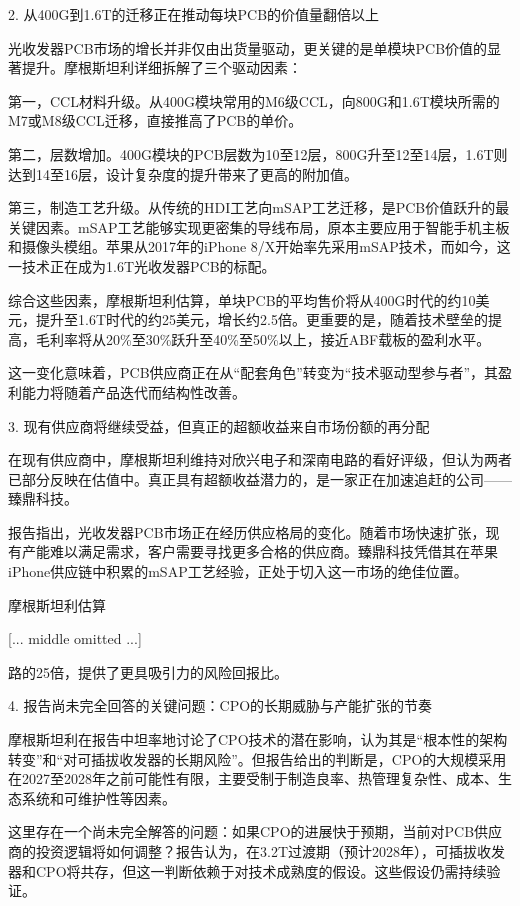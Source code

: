 \documentclass[11pt]{ctexart}
\begin{document}
2. 从400G到1.6T的迁移正在推动每块PCB的价值量翻倍以上

光收发器PCB市场的增长并非仅由出货量驱动，更关键的是单模块PCB价值的显著提升。摩根斯坦利详细拆解了三个驱动因素：

第一，CCL材料升级。从400G模块常用的M6级CCL，向800G和1.6T模块所需的M7或M8级CCL迁移，直接推高了PCB的单价。

第二，层数增加。400G模块的PCB层数为10至12层，800G升至12至14层，1.6T则达到14至16层，设计复杂度的提升带来了更高的附加值。

第三，制造工艺升级。从传统的HDI工艺向mSAP工艺迁移，是PCB价值跃升的最关键因素。mSAP工艺能够实现更密集的导线布局，原本主要应用于智能手机主板和摄像头模组。苹果从2017年的iPhone 8/X开始率先采用mSAP技术，而如今，这一技术正在成为1.6T光收发器PCB的标配。

综合这些因素，摩根斯坦利估算，单块PCB的平均售价将从400G时代的约10美元，提升至1.6T时代的约25美元，增长约2.5倍。更重要的是，随着技术壁垒的提高，毛利率将从20\%至30\%跃升至40\%至50\%以上，接近ABF载板的盈利水平。

这一变化意味着，PCB供应商正在从“配套角色”转变为“技术驱动型参与者”，其盈利能力将随着产品迭代而结构性改善。

3. 现有供应商将继续受益，但真正的超额收益来自市场份额的再分配

在现有供应商中，摩根斯坦利维持对欣兴电子和深南电路的看好评级，但认为两者已部分反映在估值中。真正具有超额收益潜力的，是一家正在加速追赶的公司——臻鼎科技。

报告指出，光收发器PCB市场正在经历供应格局的变化。随着市场快速扩张，现有产能难以满足需求，客户需要寻找更多合格的供应商。臻鼎科技凭借其在苹果iPhone供应链中积累的mSAP工艺经验，正处于切入这一市场的绝佳位置。

摩根斯坦利估算

[... middle omitted ...]

路的25倍，提供了更具吸引力的风险回报比。

4. 报告尚未完全回答的关键问题：CPO的长期威胁与产能扩张的节奏

摩根斯坦利在报告中坦率地讨论了CPO技术的潜在影响，认为其是“根本性的架构转变”和“对可插拔收发器的长期风险”。但报告给出的判断是，CPO的大规模采用在2027至2028年之前可能性有限，主要受制于制造良率、热管理复杂性、成本、生态系统和可维护性等因素。

这里存在一个尚未完全解答的问题：如果CPO的进展快于预期，当前对PCB供应商的投资逻辑将如何调整？报告认为，在3.2T过渡期（预计2028年），可插拔收发器和CPO将共存，但这一判断依赖于对技术成熟度的假设。这些假设仍需持续验证。
\end{document}
